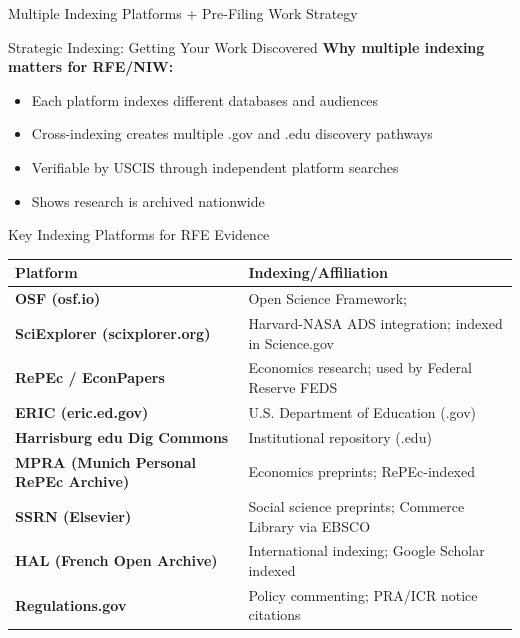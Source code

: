 \documentclass[11pt]{beamer}
\begin{document}
	\begin{frame}{Multiple Indexing Platforms + Pre-Filing Work Strategy}
		\scriptsize
		\begin{block}{Strategic Indexing: Getting Your Work Discovered}
			\textbf{Why multiple indexing matters for RFE/NIW:}
			\begin{itemize}
				\item Each platform indexes different databases and audiences
				\item Cross-indexing creates multiple .gov and .edu discovery pathways
				\item Verifiable by USCIS through independent platform searches
				\item Shows research is archived nationwide
			\end{itemize}
		\end{block}
		
		\begin{block}{Key Indexing Platforms for RFE Evidence}
			\centering
			\begin{tabular}{|p{4.5cm}|p{7cm}|}
				\hline
				\textbf{Platform} & \textbf{Indexing/Affiliation} \\
				\hline
				\textbf{OSF (osf.io)} & Open Science Framework;  \\
				\hline
				\textbf{SciExplorer (scixplorer.org)} & Harvard-NASA ADS integration; indexed in Science.gov \\
				\hline
				\textbf{RePEc / EconPapers} & Economics research; used by Federal Reserve FEDS \\
				\hline
				\textbf{ERIC (eric.ed.gov)} & U.S. Department of Education (.gov) \\
				\hline
				\textbf{Harrisburg edu Dig Commons} & Institutional repository (.edu) \\
				\hline
				\textbf{MPRA (Munich Personal RePEc Archive)} & Economics preprints; RePEc-indexed \\
				\hline
				\textbf{SSRN (Elsevier)} & Social science preprints; Commerce Library via EBSCO \\
					\hline
				\textbf{HAL (French Open Archive)} & International indexing; Google Scholar indexed \\
				\hline
				\textbf{Regulations.gov} & Policy commenting; PRA/ICR notice citations \\
				\hline
			\end{tabular}
		\end{block}
	\end{frame}
	
\end{document}
